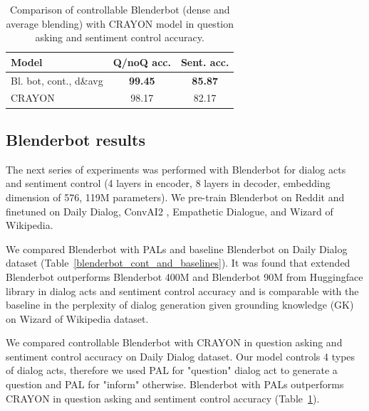 \documentclass[11pt]{article}
\begin{document}
\begin{table}[ht]
\fontsize{9}{11}
\selectfont 
\centering
\begin{tabular}{lcc}
\hline
Model                          & Q/noQ acc.  & Sent. acc. \\ \hline
Bl. bot, cont., d\&avg & \textbf{99.45} & \textbf{85.87} \\
CRAYON                         & 98.17 & 82.17 \\
\hline
\end{tabular}
\caption{Comparison of controllable Blenderbot (dense and average blending) with CRAYON model in question asking and sentiment control accuracy.}
\label{blenderbot_cont_and_crayon}
\end{table}

\subsection{Blenderbot results}

The next series of experiments was performed with Blenderbot for dialog acts and sentiment control (4 layers in encoder, 8 layers in decoder, embedding dimension of 576, 119M parameters). %
We pre-train Blenderbot on Reddit and finetuned on Daily Dialog, ConvAI2 \cite{dinan2020second}, Empathetic Dialogue, and Wizard of Wikipedia.

We compared Blenderbot with PALs and baseline Blenderbot on Daily Dialog dataset (Table~\ref{blenderbot_cont_and_baselines}). It was found that extended Blenderbot outperforms Blenderbot 400M and Blenderbot 90M from Huggingface library in dialog acts and sentiment control accuracy and is comparable with the baseline in the perplexity of dialog generation given grounding knowledge (GK) on Wizard of Wikipedia dataset.

We compared controllable Blenderbot with CRAYON \cite{hu2021controllable} in question asking and sentiment control accuracy on Daily Dialog dataset. Our model controls 4 types of dialog acts, therefore we used PAL for "question"{} dialog act to generate a question and PAL for "inform" otherwise. Blenderbot with PALs outperforms CRAYON in question asking and sentiment control accuracy (Table~\ref{blenderbot_cont_and_crayon}).
\end{document}
